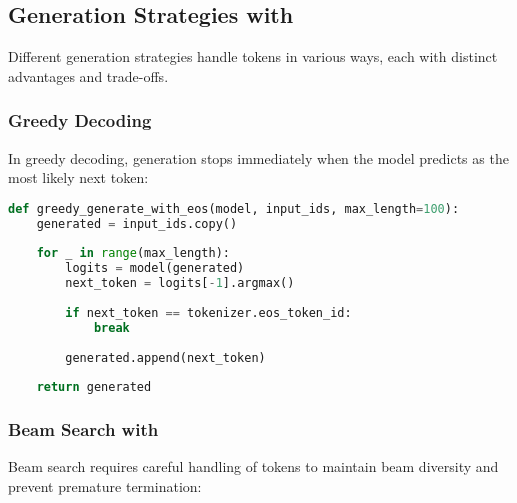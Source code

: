 \subsection{Generation Strategies with \eos{}}

Different generation strategies handle \eos{} tokens in various ways, each with distinct advantages and trade-offs.

\subsubsection{Greedy Decoding}

In greedy decoding, generation stops immediately when the model predicts \eos{} as the most likely next token:

\begin{lstlisting}[language=Python, caption=Greedy generation with \eos{} stopping]
def greedy_generate_with_eos(model, input_ids, max_length=100):
    generated = input_ids.copy()
    
    for _ in range(max_length):
        logits = model(generated)
        next_token = logits[-1].argmax()
        
        if next_token == tokenizer.eos_token_id:
            break
            
        generated.append(next_token)
    
    return generated
\end{lstlisting}

\subsubsection{Beam Search with \eos{}}

Beam search requires careful handling of \eos{} tokens to maintain beam diversity and prevent premature termination:
\begin{comment}
Feedback: This is a key point that often trips up practitioners. It would be valuable to explain *why* it's tricky. For example: "The challenge in beam search is that a shorter, completed sequence (one that has generated an [EOS] token) might have a higher probability than a longer, more promising sequence that is still being generated. Simply picking the highest-probability sequence at each step could lead to prematurely short outputs. Therefore, completed beams must be set aside and compared only at the very end, often with a length penalty to balance score and length."
\end{comment}

